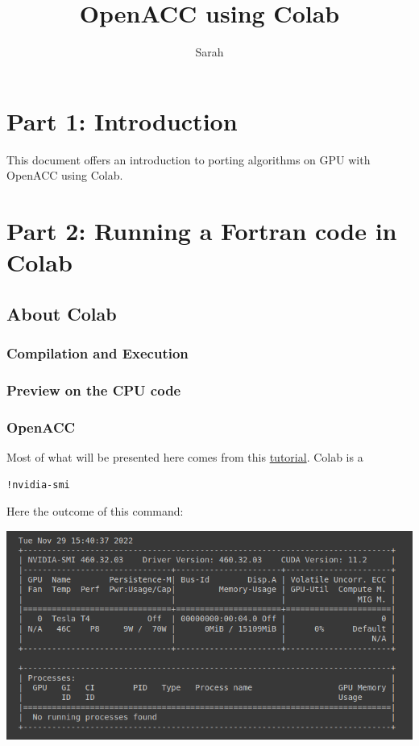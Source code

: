 \documentclass[10pt,a4paper]{article}
\author{Sarah}
\title{OpenACC using Colab}
\begin{document}
\maketitle{}
\newpage

\section{Part 1: Introduction}
This document offers an introduction to porting algorithms on GPU with OpenACC using Colab.\\

\section{Part 2: Running a Fortran code in Colab}
\subsection{About Colab}


\subsubsection{Compilation and Execution}

\subsubsection{Preview on the CPU code}


\subsubsection{OpenACC}
Most of what will be presented here comes from this \href{https://colab.research.google.com/github/ENCCS/OpenACC-CUDA-beginners/blob/colab_gcc/examples/openACC_CUDA_colab.ipynb}{tutorial}.
Colab is a 
\begin{lstlisting}
!nvidia-smi
\end{lstlisting}
Here the outcome of this command:
\begin{center}
\includegraphics[scale=0.8]{nvidiasmi.png}
\end{center}
\end{document}
